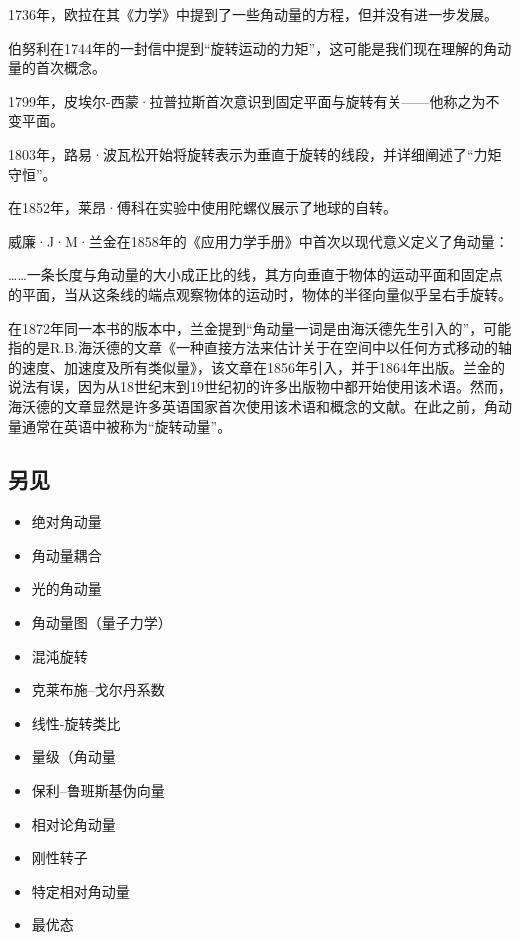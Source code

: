 1736年，欧拉在其《力学》中提到了一些角动量的方程，但并没有进一步发展。

伯努利在1744年的一封信中提到“旋转运动的力矩”，这可能是我们现在理解的角动量的首次概念。

1799年，皮埃尔-西蒙·拉普拉斯首次意识到固定平面与旋转有关——他称之为不变平面。

1803年，路易·波瓦松开始将旋转表示为垂直于旋转的线段，并详细阐述了“力矩守恒”。

在1852年，莱昂·傅科在实验中使用陀螺仪展示了地球的自转。

威廉·J·M·兰金在1858年的《应用力学手册》中首次以现代意义定义了角动量：

……一条长度与角动量的大小成正比的线，其方向垂直于物体的运动平面和固定点的平面，当从这条线的端点观察物体的运动时，物体的半径向量似乎呈右手旋转。

在1872年同一本书的版本中，兰金提到“角动量一词是由海沃德先生引入的”，可能指的是R.B.海沃德的文章《一种直接方法来估计关于在空间中以任何方式移动的轴的速度、加速度及所有类似量》，该文章在1856年引入，并于1864年出版。兰金的说法有误，因为从18世纪末到19世纪初的许多出版物中都开始使用该术语。然而，海沃德的文章显然是许多英语国家首次使用该术语和概念的文献。在此之前，角动量通常在英语中被称为“旋转动量”。
\subsection{另见}
\begin{itemize}
\item 绝对角动量
\item 角动量耦合
\item 光的角动量
\item 角动量图（量子力学）
\item 混沌旋转
\item 克莱布施–戈尔丹系数
\item 线性-旋转类比
\item 量级（角动量
\item 保利–鲁班斯基伪向量
\item 相对论角动量
\item 刚性转子
\item 特定相对角动量
\item 最优态
\end{itemize}
